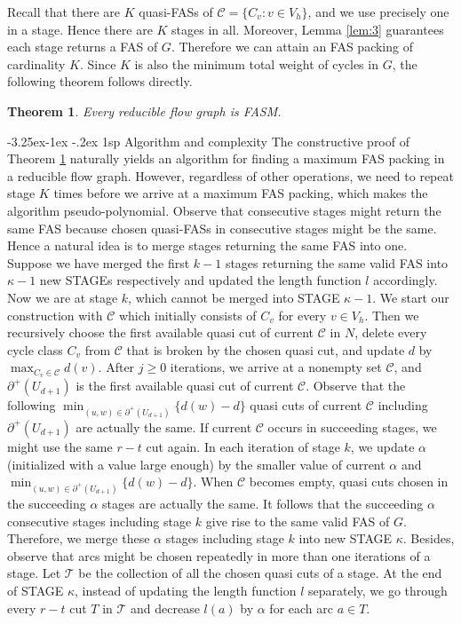 \documentclass[11pt]{article}
\makeatletter
\newtheorem{theorem}{Theorem}[section]
\renewcommand\subsection{%
  \@startsection{subsection}{2}
                {\z@}%
                {-3.25ex\@plus -1ex \@minus -.2ex}%
                {1sp}%
                {\normalsize\bfseries}%
}
\makeatother
\begin{document}
Recall that there are $K$ quasi-FASs of $\mathcal{C}=\{C_v:v\in V_h\}$, and we use precisely one in a stage. Hence there are $K$ stages in all. Moreover, Lemma \ref{lem:3} guarantees each stage returns a FAS of $G$. Therefore we can attain an FAS packing of cardinality $K$. Since $K$ is also the minimum total weight of cycles in $G$, the following theorem follows directly.

\begin{theorem}
\label{thm:4}
Every reducible flow graph is FASM.
\end{theorem}

\subsection{Algorithm and complexity}
\label{sec:5}
The constructive proof of Theorem \ref{thm:4} naturally yields an algorithm for finding a maximum FAS packing in a reducible flow graph. However, regardless of other operations, we need to repeat stage $K$ times before we arrive at a maximum FAS packing, which makes the algorithm pseudo-polynomial. Observe that consecutive stages might return the same FAS because chosen quasi-FASs in consecutive stages might be the same. Hence a natural idea is to merge stages returning the same FAS into one.  
Suppose we have merged the first $k-1$ stages returning the same valid FAS into $\kappa-1$ new STAGEs respectively and updated the length function $l$ accordingly. Now we are at stage $k$, which cannot be merged into STAGE $\kappa-1$. We start our construction with $\mathcal{C}$ which initially consists of $C_v$ for every $v\in V_h$. Then we recursively choose the first available quasi cut of current $\mathcal{C}$ in $N$, delete every cycle class $C_v$ from $\mathcal{C}$ that is broken by the chosen quasi cut, and update $d$ by $\max_{C_v\in\mathcal{C}} d(v)$. After $j\geq 0$ iterations, we arrive at a nonempty set $\mathcal{C}$, and $\partial^+(U_{d+1})$ is the first available quasi cut of current $\mathcal{C}$. Observe that the following $\min_{(u,w)\in\partial^+(U_{d+1})}\{d(w)-d\}$ quasi cuts of current $\mathcal{C}$ including $\partial^+(U_{d+1})$ are actually the same. If current $\mathcal{C}$ occurs in succeeding stages, we might use the same $r-t$ cut again. In each iteration of stage $k$, we update $\alpha$ (initialized with a value large enough) by the smaller value of current $\alpha$ and $\min_{(u,w)\in\partial^+(U_{d+1})}\{d(w)-d\}$. When $\mathcal{C}$ becomes empty, quasi cuts chosen in the succeeding $\alpha$ stages are actually the same. It follows that the succeeding $\alpha$ consecutive stages including stage $k$ give rise to the same valid FAS of $G$. Therefore, we merge these $\alpha$ stages including stage $k$ into new STAGE $\kappa$. Besides, observe that arcs might be chosen repeatedly in more than one iterations of a stage. Let $\mathcal{T}$ be the collection of all the chosen quasi cuts of a stage. At the end of STAGE $\kappa$, instead of updating the length function $l$ separately, we go through every $r-t$ cut $T$ in $\mathcal{T}$ and decrease $l(a)$ by $\alpha$ for each arc $a\in T$.
\end{document}
